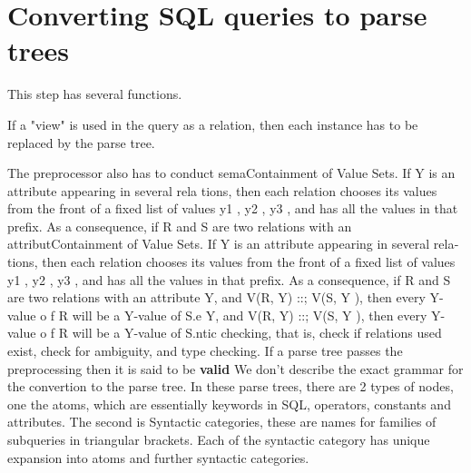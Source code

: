 \section{Converting SQL queries to parse trees}
This step has several functions.
\par If a "view" is used in the query as a relation, then each instance has to be replaced by the parse tree.
\par The preprocessor also has to conduct semaContainment of Value Sets. If Y is an attribute appearing in several rela­
tions, then each relation chooses its values from the front of a fixed list of
values y1 , y2 , y3 ,
and has all the values in that prefix. As a consequence,
if R and S are two relations with an attributContainment of Value Sets. If Y is an attribute appearing in several rela­
tions, then each relation chooses its values from the front of a fixed list of
values y1 , y2 , y3 ,
and has all the values in that prefix. As a consequence,
if R and S are two relations with an attribute Y, and V(R, Y) ::; V(S, Y ),
then every Y-value o f R will be a Y-value of S.e Y, and V(R, Y) ::; V(S, Y ),
then every Y-value o f R will be a Y-value of S.ntic checking, that is, check if relations used exist, check for ambiguity, and type checking.
If a parse tree passes the preprocessing then it is said to be \textbf{valid}
We don't describe the exact grammar for the convertion to the parse tree. In these parse trees, there are 2 types of nodes, one the atoms, which are essentially keywords in SQL, operators, constants and attributes. The second is Syntactic categories, these are names for families of subqueries in triangular brackets. Each of the syntactic category has unique expansion into atoms and further syntactic categories.


